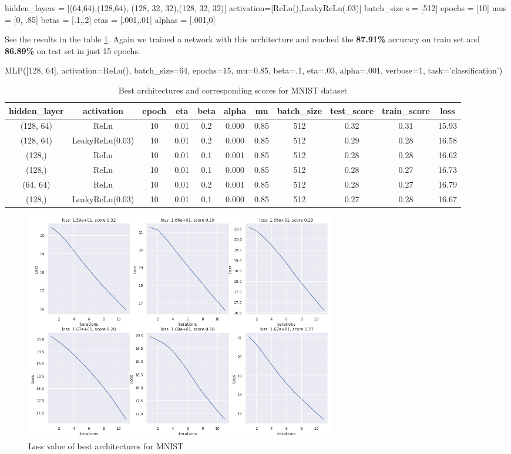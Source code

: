 \documentclass[10pt]{SelfArx} %
\begin{document}
\begin{python}
hidden_layers = [(64,64),(128,64),
 (128, 32, 32),(128, 32, 32)]
activation=[ReLu(),LeakyReLu(.03)]
batch_size	s = [512]
epochs = [10]
mus = [0, .85]
betas = [.1,.2]
etas = [.001,.01]
alphas = [.001,0]
\end{python}
See the results in the table \ref{tmnist}. Again we trained a network with this architecture and reached the \textbf{87.91\%} accuracy on train set and \textbf{86.89\%} on test set in just 15 epochs.
\begin{python}
MLP([128, 64], activation=ReLu(),
batch_size=64, epochs=15, mu=0.85,
beta=.1, eta=.03, alpha=.001,
verbose=1, task='classification')
\end{python}
\begin{table}[]
  \begin{tabular*}{1\textwidth}{@{\extracolsep{\fill} }ccccccccccc@{}}
		\toprule
		hidden\_layer & activation & epoch & eta & beta & alpha & mu & batch\_size & test\_score & train\_score & loss \\ \midrule
		(128, 64) & ReLu & 10 & 0.01 & 0.2 & 0.000 & 0.85 & 512 & 0.32 & 0.31 & 15.93 \\
		(128, 64) & LeakyReLu(0.03) & 10 & 0.01 & 0.2 & 0.000 & 0.85 & 512 & 0.29 & 0.28 & 16.58 \\
		(128,) & ReLu & 10 & 0.01 & 0.1 & 0.001 & 0.85 & 512 & 0.28 & 0.28 & 16.62 \\
		(128,) & ReLu & 10 & 0.01 & 0.1 & 0.000 & 0.85 & 512 & 0.28 & 0.27 & 16.73 \\
		(64, 64) & ReLu & 10 & 0.01 & 0.2 & 0.001 & 0.85 & 512 & 0.28 & 0.27 & 16.79 \\
		(128,) & LeakyReLu(0.03) & 10 & 0.01 & 0.1 & 0.000 & 0.85 & 512 & 0.27 & 0.28 & 16.67 \\ \bottomrule
	\end{tabular*}
	\caption{Best architectures and corresponding scores for MNIST dataset}
	\label{tmnist}
\end{table}
\begin{figure}\centering
	\includegraphics[width=1.79\columnwidth, height=10cm]{img/mnist-plots1}
	\caption{Loss value of best architectures for MNIST}
	\label{fmnist}
\end{figure}
\end{document}
